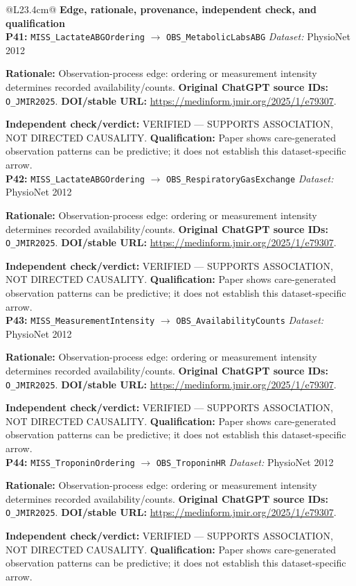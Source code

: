 \begin{tabular}{@{}L{23.4cm}@{}}
\toprule
\textbf{Edge, rationale, provenance, independent check, and qualification}\\
\midrule
\textbf{P41:} \nolinkurl{MISS_LactateABGOrdering} $\rightarrow$ \nolinkurl{OBS_MetabolicLabsABG} \hfill \textit{Dataset:} PhysioNet 2012\par\textbf{Rationale:} Observation-process edge: ordering or measurement intensity determines recorded availability/counts. \textbf{Original ChatGPT source IDs:} \nolinkurl{O_JMIR2025}. \textbf{DOI/stable URL:} \url{https://medinform.jmir.org/2025/1/e79307}.\par\textbf{Independent check/verdict:} VERIFIED --- SUPPORTS ASSOCIATION, NOT DIRECTED CAUSALITY. \textbf{Qualification:} Paper shows care-generated observation patterns can be predictive; it does not establish this dataset-specific arrow. \\
\addlinespace[2pt]
\midrule
\textbf{P42:} \nolinkurl{MISS_LactateABGOrdering} $\rightarrow$ \nolinkurl{OBS_RespiratoryGasExchange} \hfill \textit{Dataset:} PhysioNet 2012\par\textbf{Rationale:} Observation-process edge: ordering or measurement intensity determines recorded availability/counts. \textbf{Original ChatGPT source IDs:} \nolinkurl{O_JMIR2025}. \textbf{DOI/stable URL:} \url{https://medinform.jmir.org/2025/1/e79307}.\par\textbf{Independent check/verdict:} VERIFIED --- SUPPORTS ASSOCIATION, NOT DIRECTED CAUSALITY. \textbf{Qualification:} Paper shows care-generated observation patterns can be predictive; it does not establish this dataset-specific arrow. \\
\addlinespace[2pt]
\midrule
\textbf{P43:} \nolinkurl{MISS_MeasurementIntensity} $\rightarrow$ \nolinkurl{OBS_AvailabilityCounts} \hfill \textit{Dataset:} PhysioNet 2012\par\textbf{Rationale:} Observation-process edge: ordering or measurement intensity determines recorded availability/counts. \textbf{Original ChatGPT source IDs:} \nolinkurl{O_JMIR2025}. \textbf{DOI/stable URL:} \url{https://medinform.jmir.org/2025/1/e79307}.\par\textbf{Independent check/verdict:} VERIFIED --- SUPPORTS ASSOCIATION, NOT DIRECTED CAUSALITY. \textbf{Qualification:} Paper shows care-generated observation patterns can be predictive; it does not establish this dataset-specific arrow. \\
\addlinespace[2pt]
\midrule
\textbf{P44:} \nolinkurl{MISS_TroponinOrdering} $\rightarrow$ \nolinkurl{OBS_TroponinHR} \hfill \textit{Dataset:} PhysioNet 2012\par\textbf{Rationale:} Observation-process edge: ordering or measurement intensity determines recorded availability/counts. \textbf{Original ChatGPT source IDs:} \nolinkurl{O_JMIR2025}. \textbf{DOI/stable URL:} \url{https://medinform.jmir.org/2025/1/e79307}.\par\textbf{Independent check/verdict:} VERIFIED --- SUPPORTS ASSOCIATION, NOT DIRECTED CAUSALITY. \textbf{Qualification:} Paper shows care-generated observation patterns can be predictive; it does not establish this dataset-specific arrow. \\

\end{tabular}

